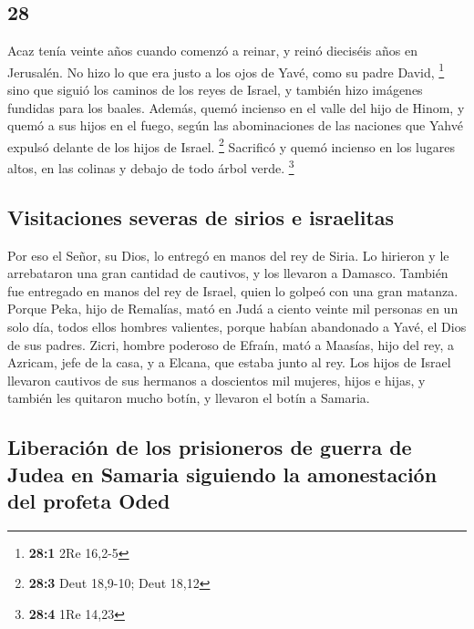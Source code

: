 \begin{paracol}{2}
\hypertarget{section-54}{%
\section{28}\label{section-54}}

 Acaz tenía veinte años cuando comenzó a reinar, y reinó
dieciséis años en Jerusalén. No hizo lo que era justo a los ojos de
Yavé, como su padre David, \footnote{\textbf{28:1} 2Re 16,2-5}
 sino que siguió los caminos de los reyes de Israel, y
también hizo imágenes fundidas para los baales.  Además,
quemó incienso en el valle del hijo de Hinom, y quemó a sus hijos en el
fuego, según las abominaciones de las naciones que Yahvé expulsó delante
de los hijos de Israel. \footnote{\textbf{28:3} Deut 18,9-10; Deut 18,12}
 Sacrificó y quemó incienso en los lugares altos, en las
colinas y debajo de todo árbol verde. \footnote{\textbf{28:4} 1Re 14,23}

\hypertarget{visitaciones-severas-de-sirios-e-israelitas}{%
\subsection{Visitaciones severas de sirios e
israelitas}\label{visitaciones-severas-de-sirios-e-israelitas}}

 Por eso el Señor, su Dios, lo entregó en manos del rey de
Siria. Lo hirieron y le arrebataron una gran cantidad de cautivos, y los
llevaron a Damasco. También fue entregado en manos del rey de Israel,
quien lo golpeó con una gran matanza.  Porque Peka, hijo
de Remalías, mató en Judá a ciento veinte mil personas en un solo día,
todos ellos hombres valientes, porque habían abandonado a Yavé, el Dios
de sus padres.  Zicri, hombre poderoso de Efraín, mató a
Maasías, hijo del rey, a Azricam, jefe de la casa, y a Elcana, que
estaba junto al rey.  Los hijos de Israel llevaron
cautivos de sus hermanos a doscientos mil mujeres, hijos e hijas, y
también les quitaron mucho botín, y llevaron el botín a Samaria.

\hypertarget{liberaciuxf3n-de-los-prisioneros-de-guerra-de-judea-en-samaria-siguiendo-la-amonestaciuxf3n-del-profeta-oded}{%
\subsection{Liberación de los prisioneros de guerra de Judea en Samaria
siguiendo la amonestación del profeta
Oded}\label{liberaciuxf3n-de-los-prisioneros-de-guerra-de-judea-en-samaria-siguiendo-la-amonestaciuxf3n-del-profeta-oded}}


\end{paracol}
